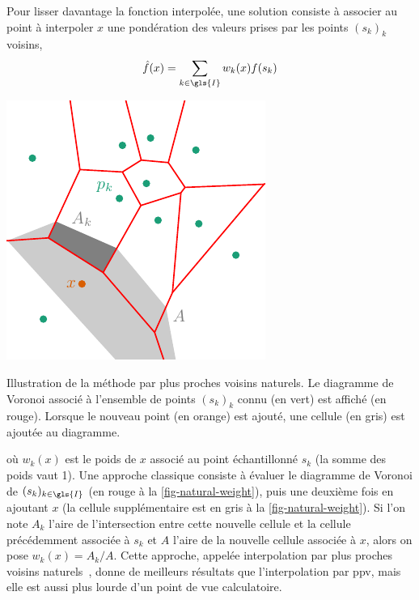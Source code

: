 Pour lisser davantage la fonction interpolée, une solution consiste à associer au point à interpoler $x$ une pondération des valeurs prises par les points $(s_k)_k$ voisins, \ie\
\begin{equation}\label{eq-weighted-interp}
    \hat{f}(x) = \sum_{k\in\gls{I}} w_k(x) f(s_k)
\end{equation}%
\begin{marginfigure}%
    \centering
    \includegraphics[]{img/chapitre2/figure3/Voronoi_Natural.pdf}
    \caption{Illustration de la méthode par plus proches voisins naturels. Le diagramme de Voronoi associé à l'ensemble de points $(s_k)_k$ connu (en vert) est affiché (en rouge). Lorsque le nouveau point (en orange) est ajouté, une cellule (en gris) est ajoutée au diagramme.}
    \label{fig-natural-weight}
\end{marginfigure}%
\noindent où $w_k(x)$ est le poids de $x$ associé au point échantillonné $s_k$ (la somme des poids vaut 1). Une approche classique consiste à évaluer le diagramme de Voronoi de $(s_k)_{k\in\gls{I}}$ (en rouge à la \cref{fig-natural-weight}), puis une deuxième fois en ajoutant $x$ (la cellule supplémentaire est en gris à la \cref{fig-natural-weight}). Si l'on note $A_k$ l'aire de l'intersection entre cette nouvelle cellule et la cellule précédemment associée à $s_k$ et $A$ l'aire de la nouvelle cellule associée à $x$, alors on pose $w_k(x)=A_k/A$. Cette approche, appelée interpolation par plus proches voisins naturels~\cite{sibson1981interpreting,cazals2006delaunay}, donne de meilleurs résultats que l'interpolation par \gls{ppv}, mais elle est aussi plus lourde d'un point de vue calculatoire.

